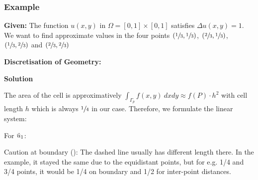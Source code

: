 
\subsubsection{Example}

\textbf{Given:} The function $u(x,y)$ in $\Omega=[0,1]\times[0,1]$ satisfies $\Delta u(x,y) = 1$.
We want to find approximate values in the four points
$(\sfrac{1}{3},\sfrac{1}{3})$, $(\sfrac{2}{3}, \sfrac{1}{3})$,
$(\sfrac{1}{3}, \sfrac{2}{3})$ and $(\sfrac{2}{3}, \sfrac{2}{3})$

\textbf{Discretisation of Geometry:}


\textbf{Solution}

The area of the cell is approximatively
$\int_{\Gamma_p} f(x,y)\ dxdy \approx f(P)\cdot h^2$ with cell length $h$ which is always
$\sfrac{1}{4}$ in our case. Therefore, we formulate the linear system:

For $\tilde{u}_1$:

{\color{gray}
    Caution at boundary (\faWarning):
    The dashed line usually has different length there.
    In the example, it stayed the same due to the equidistant points, but for e.g. 1/4 and 3/4 points,
    it would be 1/4 on boundary and 1/2 for inter-point distances.
}

